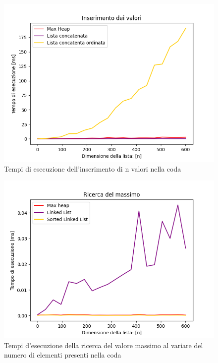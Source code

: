 \documentclass{article}
\begin{document}
\begin{figure}[H]
    \includegraphics[width=\textwidth]{Images/GraficoInserimento.png}
    \centering
    \caption{Tempi di esecuzione dell'inserimento di n valori nella coda}
    \label{fig:GraficoInserimento}
\end{figure}

\begin{figure}[h]
    \includegraphics[width=\textwidth]{Images/GraficoRicercaMassimo.png}
    \centering
    \caption{Tempi d'esecuzione della ricerca del valore massimo al variare del numero di elementi presenti nella coda}
    \label{fig:GraficoRicerca}
\end{figure}
\end{document}
